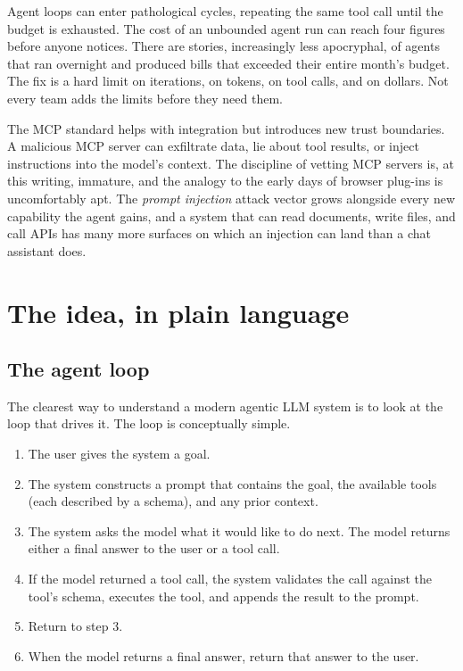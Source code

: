 Agent loops can enter pathological cycles, repeating the same
tool call until the budget is exhausted. The cost of an
unbounded agent run can reach four figures before anyone
notices. There are stories, increasingly less apocryphal, of
agents that ran overnight and produced bills that exceeded
their entire month's budget. The fix is a hard limit on
iterations, on tokens, on tool calls, and on dollars. Not
every team adds the limits before they need them.

The MCP standard helps with integration but introduces new
trust boundaries. A malicious MCP server can exfiltrate data,
lie about tool results, or inject instructions into the
model's context. The discipline of vetting MCP servers is, at
this writing, immature, and the analogy to the early days of
browser plug-ins is uncomfortably apt. The \emph{prompt
injection} attack vector grows alongside every new capability
the agent gains, and a system that can read documents, write
files, and call APIs has many more surfaces on which an
injection can land than a chat assistant does.

\section{The idea, in plain language}

\subsection*{The agent loop}

The clearest way to understand a modern agentic LLM system is
to look at the loop that drives it. The loop is conceptually
simple.

\begin{enumerate}
  \item The user gives the system a goal.
  \item The system constructs a prompt that contains the goal,
        the available tools (each described by a schema), and
        any prior context.
  \item The system asks the model what it would like to do
        next. The model returns either a final answer to the
        user or a tool call.
  \item If the model returned a tool call, the system
        validates the call against the tool's schema, executes
        the tool, and appends the result to the prompt.
  \item Return to step 3.
  \item When the model returns a final answer, return that
        answer to the user.
\end{enumerate}

